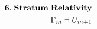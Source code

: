 \documentclass[preview]{standalone}
\begin{document}
\begin{align*}
\special{dvisvgm:raw <g id='unique000'>}\mathbf{6.\;Stratum\;Relativity}\\\Gamma_m\dashv U_{m+1}\special{dvisvgm:raw </g>}
\end{align*}
\end{document}
